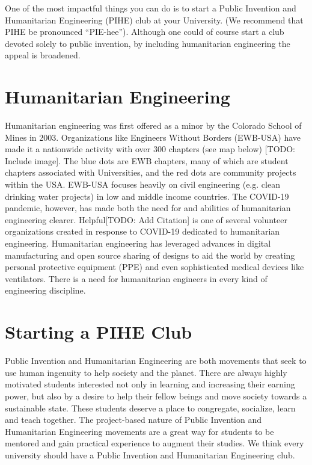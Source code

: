 \documentclass[
	fontsize=10pt, %
	twoside=false, %
	secnumdepth=1, %
]{kaobook}
\begin{document}
One of the most impactful things you can do is to start a Public Invention and Humanitarian Engineering (PIHE) club at your University.
(We recommend that PIHE be pronounced “PIE-hee”). Although one could of course start a club devoted
solely to public invention, by including humanitarian engineering the appeal is broadened.


\section{Humanitarian Engineering}

Humanitarian engineering was first offered as a minor by the Colorado
School of Mines in 2003. Organizations like Engineers Without Borders
(EWB-USA) have made it a nationwide activity with over 300 chapters
(see map below) [TODO: Include image]. The blue dots are EWB chapters, many
of which are student chapters associated with Universities, and the
red dots are community projects within the USA. EWB-USA focuses
heavily on civil engineering (e.g. clean drinking water projects) in
low and middle income countries. The COVID-19 pandemic, however, has
made both the need for and abilities of humanitarian engineering
clearer. Helpful[TODO: Add Citation] is one of several volunteer organizations created in
response to COVID-19 dedicated to humanitarian
engineering. Humanitarian engineering has leveraged advances in
digital manufacturing and open source sharing of designs to aid the
world by creating personal protective equipment (PPE) and even
sophisticated medical devices like ventilators. There is a need for
humanitarian engineers in every kind of engineering discipline.

\section{Starting a PIHE Club}

Public Invention and Humanitarian Engineering are both movements that
seek to use human ingenuity to help society and the planet. There are
always highly motivated students interested not only in learning and
increasing their earning power, but also by a desire to help their
fellow beings and move society towards a sustainable state. These
students deserve a place to congregate, socialize, learn and teach
together. The project-based nature of Public Invention and
Humanitarian Engineering movements are a great way for students to be
mentored and gain practical experience to augment their studies. We
think every university should have a Public Invention and Humanitarian
Engineering club.
\end{document}

